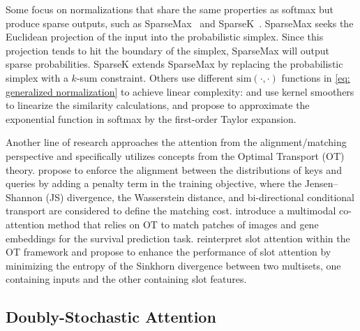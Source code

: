 Some focus on normalizations that share the same properties as softmax but produce sparse outputs, such as SparseMax~\cite{Martins2016FromST} and SparseK~\cite{lou2024sparser}. SparseMax seeks the Euclidean projection of the input into the probabilistic simplex. Since this projection tends to hit the boundary of the simplex, SparseMax will output sparse probabilities. SparseK extends SparseMax by replacing the probabilistic simplex with a $k$-sum constraint. Others use different $\text{sim}(\cdot, \cdot)$ functions in \eqref{eq: generalized normalization} to achieve linear complexity: \citet{katharopoulos2020transformers} and \citet{han2023flatten} use kernel smoothers to linearize the similarity calculations, and \citet{li2020linear} propose to approximate the exponential function in softmax by the first-order Taylor expansion. 

Another line of research approaches the attention from the alignment/matching perspective and specifically utilizes concepts from the Optimal Transport (OT) theory. \citet{zhang2021alignment} propose to enforce the alignment between the distributions of keys and queries by adding a penalty term in the training objective, where the Jensen–Shannon (JS) divergence, the Wasserstein distance, and bi-directional conditional transport \cite{zheng2021comparing} are considered to define the matching cost. \citet{xu2023multimodal} introduce a multimodal co-attention method that relies on OT to match patches of images and gene embeddings for the survival prediction task. \citet{zhang2023unlocking} reinterpret slot attention within the OT framework and propose to enhance the performance of slot attention by minimizing the entropy of the Sinkhorn divergence between two multisets, one containing inputs and the other containing slot features.

\subsection{Doubly-Stochastic Attention}

